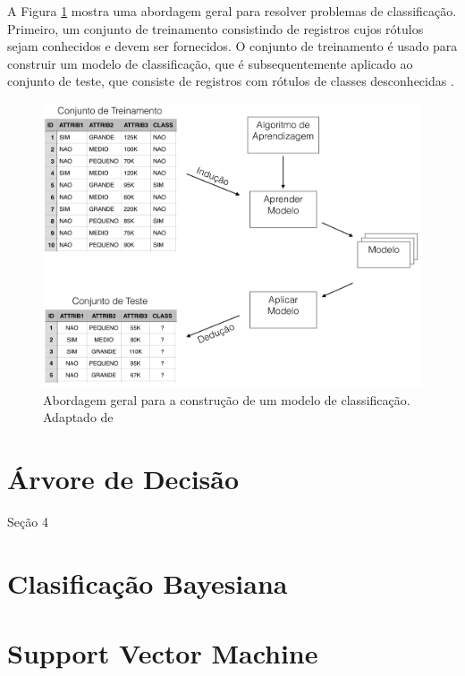 \documentclass[
	12pt,				%
	openright,			%
	oneside,	
	a4paper,				%
	english,				%
	brazil				%
]{abntex2/abntex2} %
\begin{document}
	A Figura \ref{figabordagemModeloClassificacao} mostra uma abordagem geral para resolver problemas de classificação. Primeiro, um conjunto de treinamento consistindo de registros cujos rótulos sejam conhecidos e devem ser fornecidos. O conjunto de treinamento é usado para construir um modelo de classificação, que é subsequentemente aplicado ao conjunto de teste, que consiste de registros com rótulos de classes desconhecidas \cite{tan:2009}.
	
	\begin{figure}[!htb]
		\begin{center}
			\includegraphics[scale=0.3]{img/abordagemModeloClassificacao.png}
		\end{center}
		\caption{\label{figabordagemModeloClassificacao} Abordagem geral para a construção de um modelo de classificação. Adaptado de \cite{tan:2009}}
	\end{figure}
	\section{Árvore de Decisão  }
	
		Seção 4
		
	\section{Clasificação Bayesiana}
	
	
	\section{Support Vector Machine}
\end{document}
